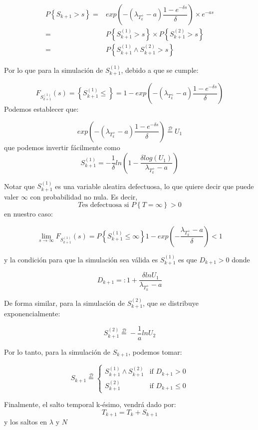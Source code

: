 \documentclass[a4paper,11pt]{book}
\begin{document}
\begin{align*}
    P\left\{ S_{k+1}>s \right\} =& exp\left(  -\left( \lambda_{T_k^+}-a \right)\dfrac{1-e^{-\delta s}}{\delta} \right)\times e^{-as}\\
    =& P\left\{ S_{k+1}^{(1)}>s \right\}\times P\left\{ S_{k+1}^{(2)}>s \right\}\\
    =& P\left\{ S_{k+1}^{(1)} \wedge S_{k+1}^{(2)}>s \right\}
\end{align*}

Por lo que para la simulación de $S_{k+1}^{(1)}$, debido a que se cumple:

$$F_{S_{k+1}^(1)}(s)=\left\{ S_{k+1}^{(1)}\leq \right\}=1-exp \left( -\left( \lambda_{T_k^+}-a \right)\dfrac{1-e^{-\delta s}}{\delta}  \right)$$
Podemos establecer que:

$$exp \left( -\left( \lambda_{T_k^+}-a \right)\dfrac{1-e^{-\delta s}}{\delta}  \right) \overset{\mathcal{D}}{=}U_1$$
que podemos invertir fácilmente como
$$S_{k+1}^{(1)}=-\dfrac{1}{\delta}ln\left( 1-\dfrac{\delta log(U_1)}{\lambda_{T_k^+}-a} \right)$$

Notar que $S_{k+1}^{(1)}$ es una variable aleatira defectuosa, lo que quiere decir que puede valer $\infty$ con probabilidad no nula. Es decir, 
$$T \text{es defectuosa si } P\left\{ T=\infty \right\}>0$$
en nuestro caso:

$$\lim_{s\to\infty}F_{S_{k+1}^{(1)}}(s)=P\left\{ S_{k+1}^{(1)}\leq \infty \right\}1-exp\left( -\dfrac{\lambda_{T_k^+}-a}{\delta} \right)<1   $$

y la condición para que la simulación sea válida es $S_{k+1}^{(1)}$ es que $D_{k+1}>0$ donde

$$D_{k+1}=:1+\dfrac{\delta lnU_1}{\lambda_{T_k^+}-a}$$

De forma similar, para la simulación de $S_{k+1}^{(2)}$, que se distribuye exponencialmente:

$$S_{k+1}^{(2)}\overset{\mathcal{D}}{=}-\dfrac{1}{a}lnU_2$$

Por lo tanto, para la simulación de $S_{k+1}$, podemos tomar:

$$
S_{k+1}\overset{\mathcal{D}}{=} 
\begin{cases}
    S_{k+1}^{(1)}\wedge S_{k+1}^{(2)} & \text{if } D_{k+1} >0\\
    S_{k+1}^{(2)} & \text{if } D_{k+1} \leq 0
\end{cases}
$$

Finalmente, el salto temporal k-ésimo, vendrá dado por: 
$$T_{k+1}=T_k+S_{k+1}$$
y los saltos en $\lambda$ y $N$
\end{document}
